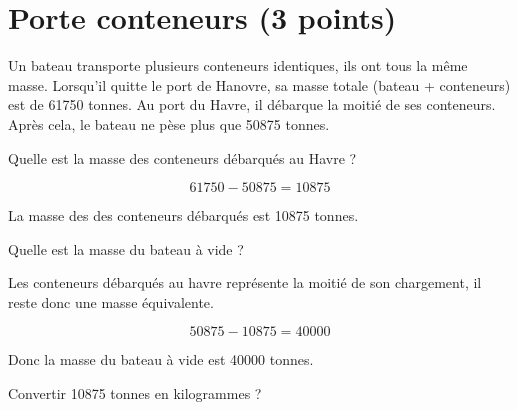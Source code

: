 \section{Porte conteneurs (3 points)}

Un bateau transporte plusieurs conteneurs identiques, ils ont tous la même masse.
Lorsqu'il quitte le port de Hanovre, sa masse totale (bateau + conteneurs) est de \num{61750} tonnes.
Au port du Havre, il débarque la moitié de ses conteneurs. Après cela, le bateau ne pèse plus que \num{50875} tonnes.

\begin{questions}
	\question[1] Quelle est la masse des conteneurs débarqués au Havre ?
	\begin{solution}
		\begin{equation*}
			\num{61750} - \num{50875} = \num{10875}
		\end{equation*}
		
		La masse des des conteneurs débarqués est \num{10875} tonnes.
	\end{solution}

	\question[1] Quelle est la masse du bateau à vide ?
	
	\begin{solution}
		Les conteneurs débarqués au havre représente la moitié de son chargement, il reste donc une masse équivalente.
		
		\begin{equation*}
			\num{50875} - \num{10875} = \num{40000}
		\end{equation*}
		
		Donc la masse du bateau à vide est \num{40000} tonnes.
	\end{solution}

	\question[1] Convertir  \num{10875} tonnes en kilogrammes ?
\end{questions}
